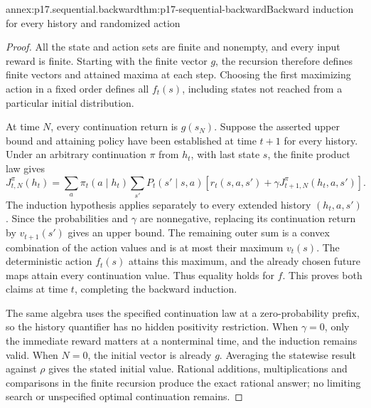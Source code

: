 \begin{annexitem}{annex:p17.sequential.backward}{thm:p17-sequential-backward}{Backward induction for every history and randomized action}
\begin{proof}
All the state and action sets are finite and nonempty,
and every input reward is finite. Starting with the
finite vector \(g\), the recursion therefore defines
finite vectors and attained maxima at each step.
Choosing the first maximizing action in a fixed order
defines all \(f_t(s)\), including states not reached
from a particular initial distribution.

At time \(N\), every continuation return is \(g(s_N)\).
Suppose the asserted upper bound and attaining policy
have been established at time \(t+1\) for every history.
Under an arbitrary continuation \(\pi\) from \(h_t\),
with last state \(s\), the finite product law gives
\[
 J_{t,N}^\pi(h_t)=
 \sum_a\pi_t(a\mid h_t)\sum_{s'}P_t(s'\mid s,a)
       \left[r_t(s,a,s')
          +\gamma J_{t+1,N}^\pi(h_t,a,s')\right].
\]
The induction hypothesis applies separately to every
extended history \((h_t,a,s')\). Since the probabilities
and \(\gamma\) are nonnegative, replacing its continuation
return by \(v_{t+1}(s')\) gives an upper bound.
The remaining outer sum is a convex combination of
the action values and is at most their maximum \(v_t(s)\).
The deterministic action \(f_t(s)\) attains this maximum,
and the already chosen future maps attain every
continuation value. Thus equality holds for \(f\).
This proves both claims at time \(t\), completing the
backward induction.

The same algebra uses the specified continuation law
at a zero-probability prefix, so the history quantifier
has no hidden positivity restriction.
When \(\gamma=0\), only the immediate reward matters
at a nonterminal time, and the induction remains valid.
When \(N=0\), the initial vector is already \(g\).
Averaging the statewise result against \(\rho\) gives
the stated initial value. Rational additions,
multiplications and comparisons in the finite recursion
produce the exact rational answer; no limiting search
or unspecified optimal continuation remains.
\end{proof}
\end{annexitem}

